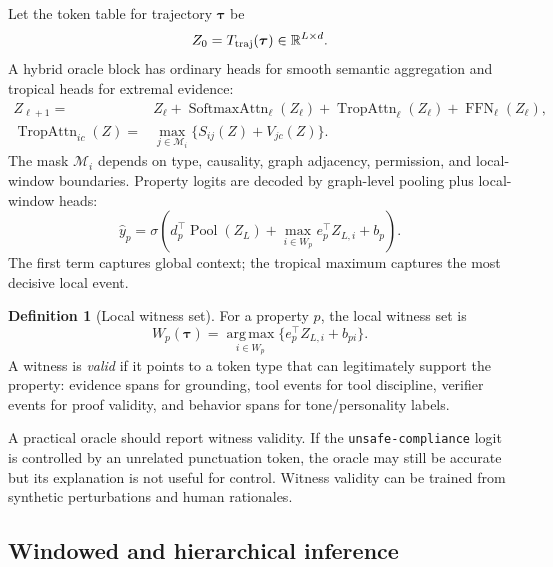 \documentclass[11pt]{article}
\theoremstyle{definition}
\newtheorem{definition}[theorem]{Definition}
\theoremstyle{remark}
\newcommand{\R}{\mathbb{R}}
\newcommand{\argmax}{\operatorname*{arg\,max}}
\newcommand{\traj}{\boldsymbol{\tau}}
\numberwithin{equation}{section}
\begin{document}
Let the token table for trajectory \(\traj\) be
\begin{equation}
    Z_0=T_{\rm traj}(\traj)\in\R^{L\times d}.
\end{equation}
A hybrid oracle block has ordinary heads for smooth semantic aggregation and tropical heads for extremal evidence:
\begin{align}
    Z_{\ell+1}={}&Z_\ell+\operatorname{SoftmaxAttn}_\ell(Z_\ell)+\operatorname{TropAttn}_\ell(Z_\ell)+\operatorname{FFN}_\ell(Z_\ell),\\
    \operatorname{TropAttn}_{ic}(Z)={}&\max_{j\in\mathcal M_i}\{S_{ij}(Z)+V_{jc}(Z)\}.
\end{align}
The mask \(\mathcal M_i\) depends on type, causality, graph adjacency, permission, and local-window boundaries.  Property logits are decoded by graph-level pooling plus local-window heads:
\begin{equation}
    \hat y_p=\sigma\left(d_p^\top \operatorname{Pool}(Z_L)+\max_{i\in W_p} e_p^\top Z_{L,i}+b_p\right).
\end{equation}
The first term captures global context; the tropical maximum captures the most decisive local event.

\begin{definition}[Local witness set]
For a property \(p\), the local witness set is
\begin{equation}
    W_p(\traj)=\argmax_{i\in W_p}\{e_p^\top Z_{L,i}+b_{pi}\}.
\end{equation}
A witness is \emph{valid} if it points to a token type that can legitimately support the property: evidence spans for grounding, tool events for tool discipline, verifier events for proof validity, and behavior spans for tone/personality labels.
\end{definition}

A practical oracle should report witness validity.  If the \texttt{unsafe-compliance} logit is controlled by an unrelated punctuation token, the oracle may still be accurate but its explanation is not useful for control.  Witness validity can be trained from synthetic perturbations and human rationales.

\subsection{Windowed and hierarchical inference}
\end{document}

